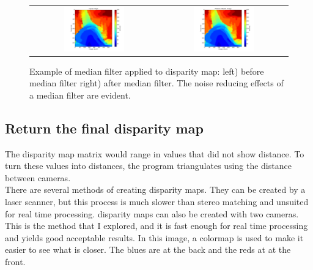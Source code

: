 \documentclass[11pt,fleqn]{article}
\begin{document}
\begin{figure}[!ht]
\centering
\begin{tabular}{cc}
\includegraphics[width=0.49\textwidth, trim=60 10 25 10, clip]{images/median1.png} &
\includegraphics[width=0.49\textwidth, trim=60 10 25 10, clip]{images/median2.png}\\
\end{tabular}
\caption[Example of median filter applied to disparity map]{Example of median filter applied to disparity map: left) before median filter right) after median filter. 
The noise reducing effects of a median filter are evident.}
\label{fig:medians}
\end{figure}

\subsection{Return the final disparity map}

The disparity map matrix would range in values that did not show distance. To turn these values into distances, the program triangulates using the distance between cameras.\\[5pt]
%
There are several methods of creating disparity maps.
They can be created by a laser scanner, but this process is much slower than stereo matching and unsuited for real time processing. disparity maps can also be created with two cameras. This is the method that I explored, and it is fast enough for real time processing and yields good acceptable results. In this image, a colormap is used to make it easier to see what is closer. The blues are at the back and the reds at at the front.
\end{document}
